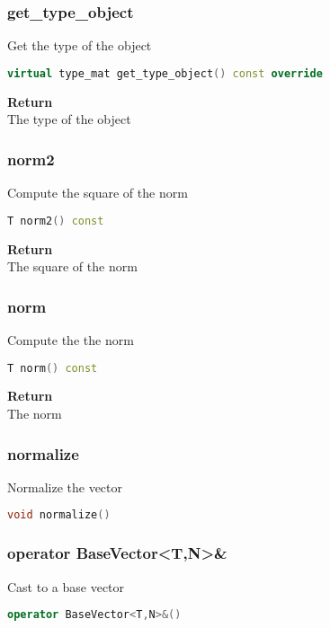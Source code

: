 \subsubsection{get\_type\_object}
\begin{mdframed}
Get the type of the object
\begin{lstlisting}[language=C++]
virtual type_mat get_type_object() const override 
\end{lstlisting}
\textbf{Return} \\ 
The type of the object\\ 
\end{mdframed}

\subsubsection{norm2}
\begin{mdframed}
Compute the square of the norm
\begin{lstlisting}[language=C++]
T norm2() const
\end{lstlisting}
\textbf{Return} \\ 
The square of the norm\\ 
\end{mdframed}

\subsubsection{norm}
\begin{mdframed}
Compute the the norm
\begin{lstlisting}[language=C++]
T norm() const
\end{lstlisting}
\textbf{Return} \\ 
The norm\\ 
\end{mdframed}

\subsubsection{normalize}
\begin{mdframed}
Normalize the vector
\begin{lstlisting}[language=C++]
void normalize()
\end{lstlisting}
\end{mdframed}

\subsubsection{operator BaseVector<T,N>\&}
\begin{mdframed}
Cast to a base vector
\begin{lstlisting}[language=C++]
operator BaseVector<T,N>&()
\end{lstlisting}
\end{mdframed}


